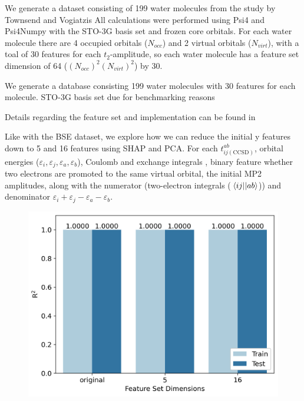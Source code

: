\documentclass[journal=jacsat,manuscript=article]{achemso}
\begin{document}
We generate a dataset consisting of 199 water molecules from the study by Townsend and Vogiatzis 
All calculations were performed using Psi4\cite{parrish_psi4_2017} and Psi4Numpy\cite{smith_psi4numpy_2018} with the STO-3G basis set\cite{hehre_selfconsistent_1970} and frozen core orbitals.
For each water molecule there are 4 occupied orbitals ($N_{occ}$) and 2 virtual orbitals ($N_{virt}$), with a toal of 30 features for each $t_{2}$-amplitude, so each water molecule has a feature set dimension of 64 ($(N_{occ})^{2}(N_{virt})^{2}$) by 30.

We generate a database consisting 199 water molecules with 30 features for each molecule.
STO-3G basis set due for benchmarking reasons


Details regarding the feature set and implementation can be found in \cite{townsend_data-driven_2019}

Like with the BSE dataset, we explore how we can reduce the initial y features down to 5 and 16 features using SHAP and PCA.
For each $t^{ab}_{ij(\text{CCSD})}$, orbital energies ($\varepsilon_{i},\varepsilon_{j},\varepsilon_{a},\varepsilon_{b}$), Coulomb and exchange integrals , binary feature whether two electrons are promoted to the same virtual orbital, the initial MP2 amplitudes, along with the numerator (two-electron integrals ($\mel{ij}{}{ab}$)) and denominator $\varepsilon_{i}+\varepsilon_{j}-\varepsilon_{a}-\varepsilon_{b}$.









\begin{figure}[H]
	\centering
	\includegraphics[width=\textwidth]{../images/DDCC/DDCC_feature_set.png}
	\caption{}
	\label{fig:DDCC_feature_set}
\end{figure}
\end{document}
